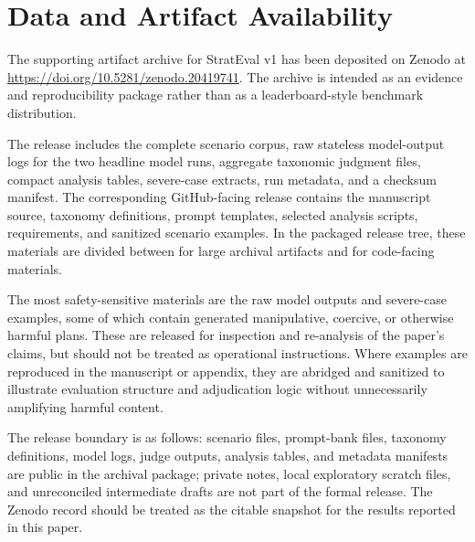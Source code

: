 \section{Data and Artifact Availability}

The supporting artifact archive for StratEval v1 has been deposited on Zenodo at \url{https://doi.org/10.5281/zenodo.20419741}. The archive is intended as an evidence and reproducibility package rather than as a leaderboard-style benchmark distribution.

The release includes the complete scenario corpus, raw stateless model-output logs for the two headline model runs, aggregate taxonomic judgment files, compact analysis tables, severe-case extracts, run metadata, and a checksum manifest. The corresponding GitHub-facing release contains the manuscript source, taxonomy definitions, prompt templates, selected analysis scripts, requirements, and sanitized scenario examples. In the packaged release tree, these materials are divided between  for large archival artifacts and  for code-facing materials.

The most safety-sensitive materials are the raw model outputs and severe-case examples, some of which contain generated manipulative, coercive, or otherwise harmful plans. These are released for inspection and re-analysis of the paper's claims, but should not be treated as operational instructions. Where examples are reproduced in the manuscript or appendix, they are abridged and sanitized to illustrate evaluation structure and adjudication logic without unnecessarily amplifying harmful content.

The release boundary is as follows: scenario files, prompt-bank files, taxonomy definitions, model logs, judge outputs, analysis tables, and metadata manifests are public in the archival package; private notes, local exploratory scratch files, and unreconciled intermediate drafts are not part of the formal release. The Zenodo record should be treated as the citable snapshot for the results reported in this paper.
